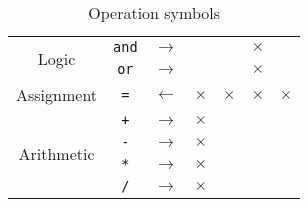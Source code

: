 \begin{table}[H]
\begin{tabular}{ |c|c|c||c|c|c|c| }
        \multirow{2}{*}{Logic}
                          & \texttt{and}
                          & $\rightarrow$
                          &
                          &
                          & $\times$
                          &
        \\

                          & \texttt{or}
                          & $\rightarrow$
                          &
                          &
                          & $\times$
                          &
        \\\hline

        Assignment
                          & \texttt{=}
                          & $\leftarrow$
                          & $\times$
                          & $\times$
                          & $\times$
                          & $\times$
        \\\hline

        \multirow{4}{*}{Arithmetic}
                          & \texttt{+}
                          & $\rightarrow$
                          & $\times$
                          &
                          &
                          &
        \\


                          & \texttt{-}
                          & $\rightarrow$
                          & $\times$
                          &
                          &
                          &
        \\

                          & \texttt{*}
                          & $\rightarrow$
                          & $\times$
                          &
                          &
                          &
        \\

                          & \texttt{/}
                          & $\rightarrow$
                          & $\times$
                          &
                          &
                          &
        \\\hline
    \end{tabular}
    \caption{Operation symbols}
    \label{table:operatorsymbols}
\end{table}
